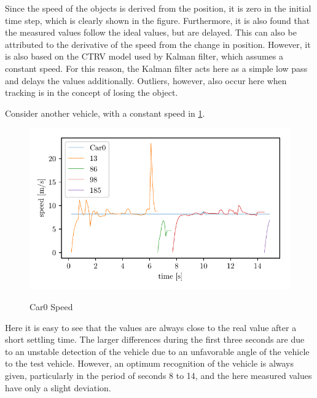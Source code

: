 \documentclass[11pt,oneside,openright]{mpreport}
\begin{document}
Since the speed of the objects is derived from the position, it is zero in the initial time step, which is clearly shown in the figure.
Furthermore, it is also found that the measured values follow the ideal values, but are delayed.
This can also be attributed to the derivative of the speed from the change in position. However, it is also based on the \ac{CTRV} model used by Kalman filter,
which assumes a constant speed. For this reason, the Kalman filter acts here as a simple low pass and delays the values additionally.
Outliers, however, also occur here when tracking is in the concept of losing the object.

Consider another vehicle, with a constant speed in \cref{car0_speed}.
\begin{figure}[!htb]
  \caption{Car0 Speed} 
  \centering
  \includegraphics[width=\textwidth]{bilder/Car0_speed.pdf}
 \label{car0_speed}
\end{figure}

Here it is easy to see that the values are always close to the real value after a short settling time. The larger differences during the first three seconds are due to an unstable detection
of the vehicle due to an unfavorable angle of the vehicle to the test vehicle. However, an optimum recognition of the vehicle is always given, particularly in the period of seconds 8 to 14,
and the here measured values have only a slight deviation.
\end{document}
